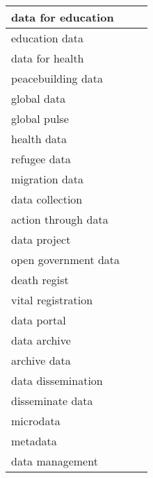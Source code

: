 \documentclass[
]{article}
\begin{document}
\begin{table}[H]
\begin{tabular}{l|l|l}
\hline
data for education &  & \\
\hline
education data &  & \\
\hline
data for health &  & \\
\hline
peacebuilding data &  & \\
\hline
global data &  & \\
\hline
global pulse &  & \\
\hline
health data &  & \\
\hline
refugee data &  & \\
\hline
migration data &  & \\
\hline
data collection &  & \\
\hline
action through data &  & \\
\hline
data project &  & \\
\hline
open government data &  & \\
\hline
death regist &  & \\
\hline
vital registration &  & \\
\hline
data portal &  & \\
\hline
data archive &  & \\
\hline
archive data &  & \\
\hline
data dissemination &  & \\
\hline
disseminate data &  & \\
\hline
microdata &  & \\
\hline
metadata &  & \\
\hline
data management &  & \\
\hline
\end{tabular}
\endgroup{}
\end{table}
\end{document}

